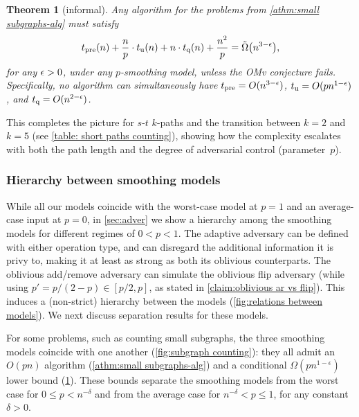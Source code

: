 \documentclass[letter,11pt]{article}
\newtheorem{atheorem}{Theorem}[section]
\newcommand{\omv}{\textnormal{\textsf{OMv}}\xspace}
\newcommand{\paths}[3]{${#1}$-${#2}$ ${#3}$-paths\xspace}
\newcommand{\tp}{t_{\textnormal{pre}}}
\newcommand{\tu}{t_{\textnormal{u}}}
\newcommand{\tq}{t_{\textnormal{q}}}
\begin{document}
\begin{atheorem}[informal]
	\label{athm:small subgraphs-lb}
	Any algorithm for the problems from \cref{athm:small subgraphs-alg} must satisfy 
    \[
	\begin{aligned}
        \tp(n) + \frac{n}{p} \cdot \tu(n) + n \cdot \tq(n) + \frac{n^2}{p}= \tilde{\Omega} \left(n^{3-\eps}\right),
    \end{aligned}
	\]
    for any $\epsilon > 0$,
    under any $p$-smoothing model,
    unless the \omv conjecture fails.
    Specifically, no algorithm 
    can simultaneously have
    $\tp=O(n^{3-\epsilon})$,
    $\tu=O(pn^{1-\epsilon})$,
    and
    $\tq=O(n^{2-\epsilon})$.
\end{atheorem}


This completes the picture for \paths{s}{t}{k} and the transition between $k=2$ and $k=5$
(see \cref{table: short paths counting}), showing how the complexity escalates with both the path length and the degree of adversarial control (parameter~$p$).


\subsubsection{Hierarchy between smoothing models}
\label{sec:hierarchy-separations}

While all our models coincide with the worst-case model at $p = 1$ and an average-case input at $p = 0$, 
in \cref{sec:adver} we show 
a hierarchy among the smoothing models for different regimes of $0 < p < 1$.
The adaptive adversary
can be defined with either operation type, 
and can disregard the additional information it is privy to, making it at least as strong as both its oblivious counterparts.
The oblivious add/remove adversary can simulate the oblivious flip adversary (while using $p' = p/(2-p)\in [p/2, p]$, as stated in \cref{claim:oblivious ar vs flip}).
This induces a (non-strict) hierarchy between the models (\cref{fig:relations between models}). We next discuss separation results for these models.

For some problems, such as counting small subgraphs, the three smoothing models coincide with one another (\cref{fig:subgraph counting}): they all admit 
an $O(pn)$ algorithm (\cref{athm:small subgraphs-alg})
and a conditional $\Omega(pn^{1-\epsilon})$ lower bound (\cref{athm:small subgraphs-lb}).
These bounds separate the smoothing models from the worst case for $0\leq p<n^{-\delta}$ and from the average case 
for $n^{-\delta}<p\leq1$, for any constant $\delta > 0$.
\end{document}
